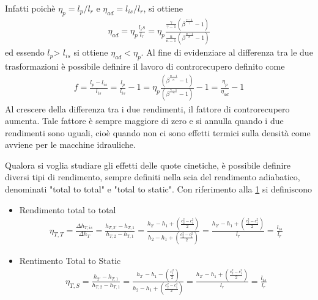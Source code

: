 \begin{figure}
\begin{minipage}{.55\textwidth}
  \label{fig:Rend4}
\end{minipage}
\end{figure}
Infatti poichè $\eta_p = l_p / l_r$ e $\eta_{ad} = l_{is} / l_r$, si ottiene
\begin{align*}
\eta_{ad} = \eta_p \frac{l_is}{l_r} = \eta_p \frac{\frac{\gamma}{\gamma-1} \left(\beta^{\frac{\gamma -1}{\gamma}}-1 \right)}{\frac{n}{n-1} \left(\beta^{\frac{n -1}{n}}-1 \right)}
\end{align*}
ed essendo $l_p$> $l_{is}$ si ottiene $\eta_{ad} < \eta_p$. Al fine di evidenziare al differenza tra le due trasformazioni è possibile definire il lavoro di controrecupero definito come
\begin{align*}
f = \frac{l_p - l_{is}}{l_{is}} = \frac{l_p}{l_{is}} -1 = \eta_p \frac{\left( \beta^{\frac{n-1}{n}} -1 \right)}{\left( \beta^{\frac{\gamma-1}{\gamma}} -1 \right)} -1 = \frac{\eta_p}{\eta_{ad}} -1
\end{align*}
Al crescere della differenza tra i due rendimenti, il fattore di controrecupero aumenta. Tale fattore è sempre maggiore di zero e si annulla quando i due rendimenti sono uguali, cioè quando non ci sono effetti termici sulla densità come avviene per le macchine idrauliche.

Qualora si voglia studiare gli effetti delle quote cinetiche, è possibile definire diversi tipi di rendimento, sempre definiti nella scia del rendimento adiabatico, denominati "total to total" e "total to static". Con riferimento alla \ref{fig:Rend4} si definiscono
\begin{itemize}
\item Rendimento total to total
\begin{align*}
\eta_{T,T} = \frac{\Delta h_{T,is}}{\Delta h_T} = \frac{h_{T,2'} - h_{T,1}}{h_{T,2} - h_{T,1}} = \frac{h_{2'} - h_1 + \left( \frac{c_2^2 - c_1^2}{2} \right)}{h_2 - h_1 + \left( \frac{c_2^2 - c_1^2}{2} \right)} = \frac{h_{2'} - h_1 + \left( \frac{c_2^2 - c_1^2}{2} \right)}{l_r} = \frac{l_{is}}{l_r}
\end{align*}
\item Rentimento Total to Static
\begin{align*}
\eta_{T,S} = \frac{h_{2'} - h_{T,1}}{h_{T,2} - h_{T,1}} = \frac{h_{2'} - h_1 - \left( \frac{ c_1^2}{2} \right)}{h_2 - h_1 + \left( \frac{c_2^2 - c_1^2}{2} \right)} = \frac{h_{2'} - h_1 + \left( \frac{c_2^2 - c_1^2}{2} \right)}{l_r} = \frac{l_{is}}{l_r}
\end{align*}
\end{itemize}
\pagebreak

